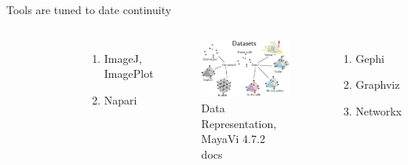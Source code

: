 \documentclass[xcolor={dvipsnames}, handout]{beamer}
\begin{document}
\begin{frame}{Tools are tuned to date continuity \cite{HeerSoftware2006}}
\begin{columns}
\begin{figure}
            \end{figure}
            \begin{enumerate}
                \item ImageJ\cite{schneiderNIHImageImageJ2012}, ImagePlot\cite{studiesCulturevisImageplot2021}
                \item Napari\cite{nicholas_sofroniew_2021_4533308}
            \end{enumerate}
            \pause
            \begin{figure}
                \includegraphics[width=1\textwidth]{figures/intro/dataset_diagram.png}
                \caption{Data Representation, MayaVi 4.7.2 docs\cite{DataRepresentationMayavi}}
            \end{figure}
            \begin{enumerate}
                \item Gephi\cite{bastianGephiOpenSource2009}
                \item Graphviz\cite{ellsonGraphvizOpenSource2002}
                \item Networkx\cite{HagbergExploringNetwork2008}
            \end{enumerate}
    \end{columns}
\end{frame}
\end{document}
